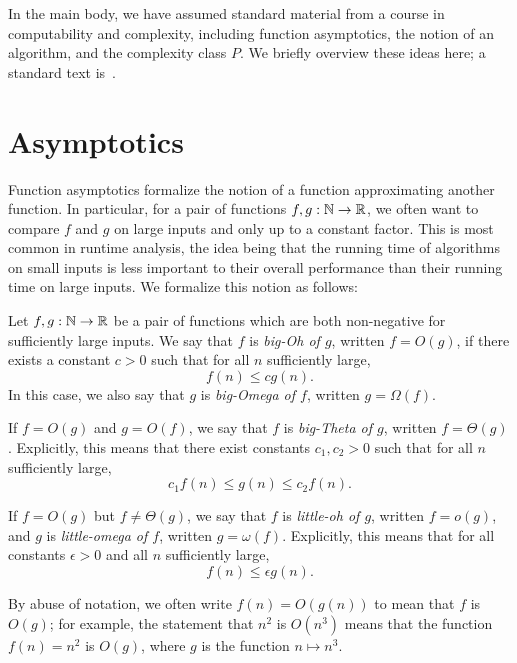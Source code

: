 In the main body, we have assumed standard material from a course in
computability and complexity, including function asymptotics, the notion of an
algorithm, and the complexity class $P$. We briefly overview these ideas here; a
standard text is~\cite{sipser-2013}.

\section{Asymptotics}

Function asymptotics formalize the notion of a function approximating another
function. In particular, for a pair of functions $f,g:\mathbb{N}\to\mathbb{R}$, we often want
to compare $f$ and $g$ on large inputs and only up to a constant factor. This is
most common in runtime analysis, the idea being that the running time of
algorithms on small inputs is less important to their overall performance than
their running time on large inputs. We formalize this notion as follows:

\begin{dfn}
  Let $f,g:\mathbb{N}\to\mathbb{R}$ be a pair of functions which are both non-negative for
  sufficiently large inputs. We say that $f$ is \emph{big-Oh of
  $g$}, written $f=O(g)$, if there exists a constant $c>0$ such that for all $n$
  sufficiently large, \[
    f(n) \leq cg(n).
  \] In this case, we also say that $g$ is \emph{big-Omega of $f$}, written $g =
  \Omega(f)$.

  If $f=O(g)$ and $g=O(f)$, we say that $f$ is \emph{big-Theta of $g$}, written
  $f = \Theta(g)$. Explicitly, this means that there exist constants $c_1,c_2>0$
  such that for all $n$ sufficiently large, \[
    c_1 f(n) \leq g(n) \leq c_2 f(n).
  \]

  If $f=O(g)$ but $f\neq\Theta(g)$, we say that $f$ is \emph{little-oh of $g$},
  written $f=o(g)$, and $g$ is \emph{little-omega of $f$}, written $g =
  \omega(f)$. Explicitly, this means that for all constants $\epsilon>0$ and all
  $n$ sufficiently large, \[
    f(n) \leq \epsilon g(n).
  \]
\end{dfn}

\begin{ntn}
  By abuse of notation, we often write $f(n) = O(g(n))$ to mean that $f$ is
  $O(g)$; for example, the statement that $n^2$ is $O(n^3)$ means that the
  function $f(n) = n^2$ is $O(g)$, where $g$ is the function $n\mapsto n^3$.
\end{ntn}

